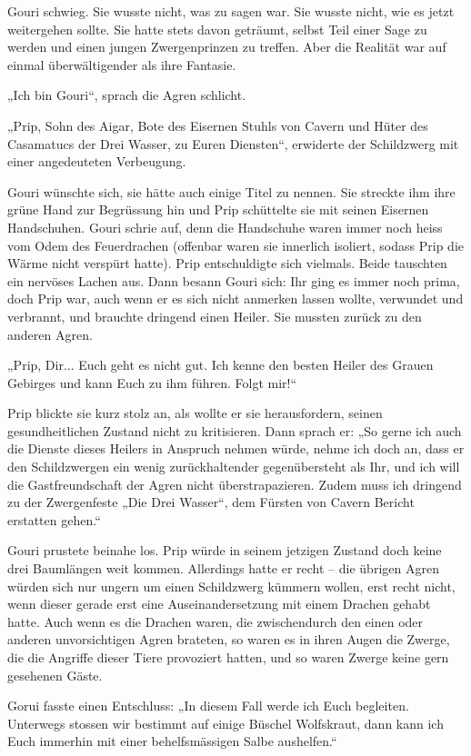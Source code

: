 \documentclass[10pt, a4paper, oneside]{book}
\begin{document}
Gouri schwieg. Sie wusste nicht, was zu sagen war. Sie wusste nicht, wie es jetzt weitergehen sollte. Sie hatte stets davon geträumt, selbst Teil einer Sage zu werden und einen jungen Zwergenprinzen zu treffen. Aber die Realität war auf einmal überwältigender als ihre Fantasie.

„Ich bin Gouri“, sprach die Agren schlicht.

„Prip, Sohn des Aigar, Bote des Eisernen Stuhls von Cavern und Hüter des Casamatucs der Drei Wasser, zu Euren Diensten“, erwiderte der Schildzwerg mit einer angedeuteten Verbeugung.

Gouri wünschte sich, sie hätte auch einige Titel zu nennen. Sie streckte ihm ihre grüne Hand zur Begrüssung hin und Prip schüttelte sie mit seinen Eisernen Handschuhen. Gouri schrie auf, denn die Handschuhe waren immer noch heiss vom Odem des Feuerdrachen (offenbar waren sie innerlich isoliert, sodass Prip die Wärme nicht verspürt hatte). Prip entschuldigte sich vielmals. Beide tauschten ein nervöses Lachen aus. Dann besann Gouri sich: Ihr ging es immer noch prima, doch Prip war, auch wenn er es sich nicht anmerken lassen wollte, verwundet und verbrannt, und brauchte dringend einen Heiler. Sie mussten zurück zu den anderen Agren.

„Prip, Dir... Euch geht es nicht gut. Ich kenne den besten Heiler des Grauen Gebirges und kann Euch zu ihm führen. Folgt mir!“

Prip blickte sie kurz stolz an, als wollte er sie herausfordern, seinen gesundheitlichen Zustand nicht zu kritisieren. Dann sprach er: „So gerne ich auch die Dienste dieses Heilers in Anspruch nehmen würde, nehme ich doch an, dass er den Schildzwergen ein wenig zurückhaltender gegenübersteht als Ihr, und ich will die Gastfreundschaft der Agren nicht überstrapazieren. Zudem muss ich dringend zu der Zwergenfeste „Die Drei Wasser“, dem Fürsten von Cavern Bericht erstatten gehen.“

Gouri prustete beinahe los. Prip würde in seinem jetzigen Zustand doch keine drei Baumlängen weit kommen. Allerdings hatte er recht – die übrigen Agren würden sich nur ungern um einen Schildzwerg kümmern wollen, erst recht nicht, wenn dieser gerade erst eine Auseinandersetzung mit einem Drachen gehabt hatte. Auch wenn es die Drachen waren, die zwischendurch den einen oder anderen unvorsichtigen Agren brateten, so waren es in ihren Augen die Zwerge, die die Angriffe dieser Tiere provoziert hatten, und so waren Zwerge keine gern gesehenen Gäste.

Gorui fasste einen Entschluss: „In diesem Fall werde ich Euch begleiten. Unterwegs stossen wir bestimmt auf einige Büschel Wolfskraut, dann kann ich Euch immerhin mit einer behelfsmässigen Salbe aushelfen.“
\end{document}
